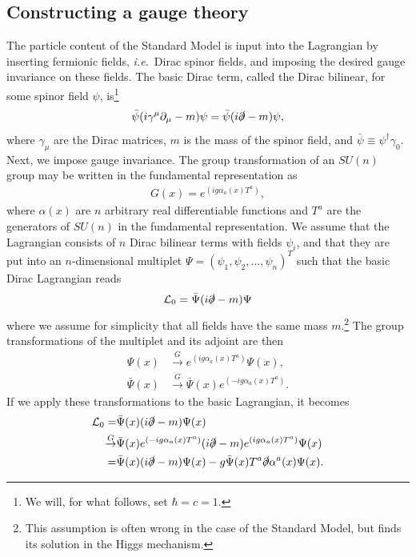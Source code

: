 \documentclass[twoside,english]{uiofysmaster}
\begin{document}
\subsection{Constructing a gauge theory}
The particle content of the Standard Model is input into the Lagrangian by inserting fermionic fields, {\it i.e.}\ Dirac spinor fields, and imposing the desired gauge invariance on these fields. The basic Dirac term, called the Dirac bilinear, for some spinor field $\psi$, is\footnote{We will, for what follows, set $\hbar = c = 1$.} 
\begin{align}
	\bar \psi (i\gamma^\mu \partial_\mu - m) \psi = \bar \psi (i\slashed\partial - m)\psi, \label{eq:diracbilinear}
\end{align}
where $\gamma_\mu$ are the Dirac matrices, $m$ is the mass of the spinor field, and $\bar\psi \equiv \psi^\dag \gamma_0$. Next, we impose gauge invariance. The group transformation of an $SU(n)$ group may be written in the fundamental representation as
\begin{align}
	G(x) = e^{(ig\alpha_a(x)T^a)},
\end{align}
where $\alpha(x)$ are $n$ arbitrary real differentiable functions and $T^a$ are the generators of $SU(n)$ in the fundamental representation. We assume that the Lagrangian consists of $n$ Dirac bilinear terms with fields $\psi_i$, and that they are put into an $n$-dimensional multiplet $\Psi = (\psi_1, \psi_2, ..., \psi_n)^T$ such that the basic Dirac Lagrangian reads
\begin{align}
	\mathcal{L}_0 = \bar\Psi(i\slashed\partial - m)\Psi
\end{align}
where we assume for simplicity that all fields have the same mass $m$.\footnote{This assumption is often wrong in the case of the Standard Model, but finds its solution in the Higgs mechanism.} The group transformations of the multiplet and its adjoint are then 
\begin{align}
	\Psi(x) &\overset{G}{\to} e^{(ig\alpha_a(x)T^a)} \Psi(x),\\
	\bar\Psi(x) &\overset{G}{\to} \bar\Psi(x) e^{(-ig\alpha_a(x)T^a)}.\nonumber
\end{align}
If we apply these transformations to the basic Lagrangian, it becomes
\begin{align}
	\mathcal{L}_0 = &\bar\Psi(x)(i\slashed\partial - m)\Psi(x)\nonumber\\
	\overset{G}{\to} &\bar\Psi(x) e^{(-ig\alpha_a(x)T^a)}(i\slashed\partial - m)e^{(ig\alpha_a(x)T^a)} \Psi(x)\\
	=	&\bar\Psi(x)(i\slashed\partial - m)\Psi(x) - g\bar\Psi(x) T^a\slashed\partial \alpha^a(x) \Psi(x).\nonumber
\end{align}
\end{document}
